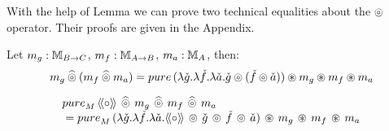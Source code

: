With the help of Lemma \label{lemma:comp_comp} we can prove two technical equalities about the $\circledcirc$ operator. Their proofs are given in the Appendix.

\begin{lemma}\label{lemma:pappl_comp_appl}
Let $m_g:\mathbb{M}_{B\rightarrow C}$, $m_f:\mathbb{M}_{A\rightarrow B}$, $m_a:\mathbb{M}_{A}$, then:
$$
m_g \alift{\pappl} (m_f \alift{\pappl} m_a)
 = \apure\, (\lambda \pstr{g}. \lambda \pstr{f}. \lambda \pstr{a}. \pstr{g} \pappl (\pstr{f}\pappl \pstr{a})) \appl m_g \appl m_f \appl m_a
$$
\end{lemma}

\begin{lemma}\label{lemma:ppair}
$$
\begin{array}{l}
\apure_M\,\ppair{\comp}\, \alift{\pappl}\, m_g\, \alift{\pappl}\, m_f\, \alift{\pappl}\, m_a \\
{}= \apure_M\,(\lambda \pstr{g}. \lambda \pstr{f}. \lambda \pstr{a}. \ppair{\comp}\, \pappl\, \pstr{g} \, \pappl\, \pstr{f} \, \pappl\, \pstr{a})\, \appl\, m_g\, \appl\, m_f\, \appl\, m_a 
\end{array}
$$
\end{lemma}

